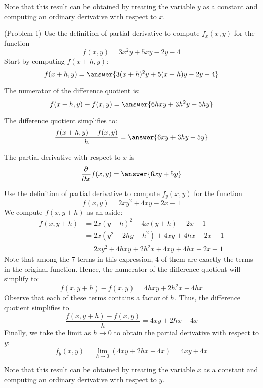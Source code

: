 \documentclass[handout]{ximera}
\begin{document}
\begin{remark}
Note that this result can be obtained by treating the variable $y$ as a constant and computing an ordinary derivative with respect to $x$.
\end{remark}

\begin{problem}(Problem 1)
Use the definition of partial derivative to compute $f_x(x,y)$ for the function
\[
f(x,y) = 3x^2y + 5xy - 2y - 4
\]
Start by computing $f(x+h, y)$:
\[
f(x+h, y) = \answer{3(x+h)^2y + 5(x+h)y - 2y - 4}
\]

The numerator of the difference quotient is:
\[
f(x+h,y) - f(x,y) = \answer{6hxy + 3h^2y + 5hy}
\]

The difference quotient simplifies to:
\[
\frac{f(x+h,y) - f(x,y)}{h} = \answer{6xy + 3hy + 5y}
\]


The partial derivative with respect to $x$ is
\[
\frac{\partial}{\partial x} f(x,y) = \answer{6xy + 5y}
\]

\end{problem}

\begin{example}[Example 2]
Use the definition of partial derivative to compute $f_y(x,y)$ for the function
\[
f(x,y) = 2xy^2 + 4xy - 2x -1
\]
We compute $f(x, y+h)$ as an aside:
\begin{align*}
f(x, y+h) &= 2x(y+h)^2 + 4x(y+h) - 2x  -1\\
          &= 2x(y^2 + 2hy + h^2) + 4xy + 4hx - 2x - 1\\
          &= 2xy^2 + 4hxy + 2h^2x + 4xy + 4hx - 2x - 1
\end{align*}
Note that among the 7 terms in this expression, 4 of them are exactly the terms in the original function.
Hence, the numerator of the difference quotient will simplify to:
\[
f(x, y+h) - f(x,y) =  4hxy + 2h^2x  + 4hx
\]
Observe that each of these terms contains a factor of $h$. Thus, the difference quotient simplifies to
\[
\frac{f(x, y+h) -f(x, y)}{h} = 4xy + 2hx +4x
\]
Finally, we take the limit as $h \to 0$ to obtain the partial derivative with respect to $y$:
\[
f_y(x,y) = \lim_{h \to 0} \left(4xy + 2hx +4x\right) = 4xy + 4x
\]

\end{example}

\begin{remark}
Note that this result can be obtained by treating the variable $x$ as a constant and computing an ordinary derivative with respect to $y$.
\end{remark}
\end{document}
